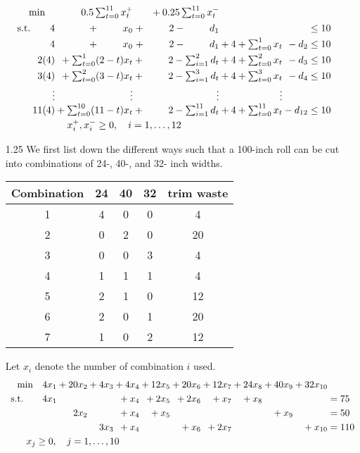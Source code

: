 \documentclass[a4paper,10pt]{article}
\theoremstyle{definition}
\begin{document}
\begin{enumerate}
\begin{align*}
  \begin{array}{r@{}r@{}r@{}r@{}r@{}r@{}r@{}r@{}r@{}l}
    \text{min} \quad&{} 0.5\sum_{t=0}^{11}x_t^+ &{} + 0.25\sum_{t=0}^{11}x_t^-&{}&{}&{} \\[\jot]
    \text{s.t.}\qquad4&{}+\phantom{\sum_{i=7}^{8}}x_0&{} +\phantom{\sum_{i=7}^{8}}2 -\phantom{\sum_{i=7}^{8}}d_1 &{}&{}&{}&{}\leq 10\\ [\jot]      
4&{}+\phantom{\sum_{i=7}^{8}}x_0&{} +\phantom{\sum_{i=7}^{8}}2-\phantom{\sum_{i=7}^{8}}d_1&{}+4&{}+\sum_{t=0}^{1}x_t&{} -d_2  &{}  \leq 10\\ [\jot]
2(4)&{}+\sum_{t=0}^{1}(2-t)x_t&{} +\phantom{\sum_{i=7}^{8}}2-\sum_{i=1}^{2}d_t&{}+4&{}+\sum_{t=0}^{2}x_t&{} -d_3&{}    \leq 10\\ [\jot]
3(4)&{}+\sum_{t=0}^{2}(3-t)x_t&{} +\phantom{\sum_{i=7}^{8}}2-\sum_{i=1}^{3}d_t&{}+4&{}+\sum_{t=0}^{3}x_t&{} -d_4&{}    \leq 10\\ [\jot]
\vdots&{}\vdots&{}\vdots&{}&{}\vdots&{}&{}&{}&{}&{}\\
11(4)&{}+\sum_{t=0}^{10}(11-t)x_t&{} +\phantom{\sum_{i=7}^{8}}2-\sum_{i=1}^{11}d_t&{}+4&{}+\sum_{t=0}^{11}x_t&{} -d_{12}&{}    \leq 10\\ [\jot]
 \multicolumn{4}{c}{x_i^+, x_i^- \geq 0, \quad i=1,\ldots,12}
  \end{array}
\end{align*}
\item[1.25]
We first list down the different ways such that a 100-inch roll can be cut into combinations of 24-, 40-, and 32- inch widths.
\begin{table}[h]
\centering
\begin{tabular}{c|c|c|c|c}
\hline
Combination&24 &40 & 32 & trim waste\\
\hline
1&4 &0 &0 & 4\\
 2&0 &2 & 0& 20\\
 3& 0 & 0& 3& 4\\
4&   1 &1 &1 &4 \\
 5&   2 &1 & 0& 12\\
  6&   2 &0 &1 & 20\\
   7&    1  &0 &2 & 12\\
       \hline
\end{tabular}
\end{table}
Let $x_i$ denote the number of combination $i$ used.
\begin{align*}
  \begin{array}{r@{}r@{}r@{}r@{}r@{}r@{}r@{}r@{}r@{}r@{}l}
    \text{min} \quad 4x_1 &{}+ 20x_2&{}+ 4x_3&{}+ 4x_4&{}+ 12x_5&{}+ 20x_6&{}+ 12x_7&{}+24x_8 &{} +40x_9 &{} +32x_{10}\\[\jot]
    \text{s.t.}\qquad  4x_1 &{} &{} &{} +x_4 &{} +2x_5&{}+2x_6&{}+x_7  &{} +x_8&{}&{}&{}= 75\\[\jot]
    &{} 2x_2&{} &{} +x_4 &{} +x_5&{}&{} &{}&{}+x_9&{}&{}= 50\\[\jot]
    &{} &{} 3x_3&{} +x_4 &{} &{}+x_6&{}+2x_7  &{} &{}&{}+x_{10}&{}= 110\\[\jot]
 \multicolumn{4}{c}{x_j \geq 0, \quad j=1,\ldots,10}
  \end{array}
\end{align*}


\end{enumerate}
\end{document}
